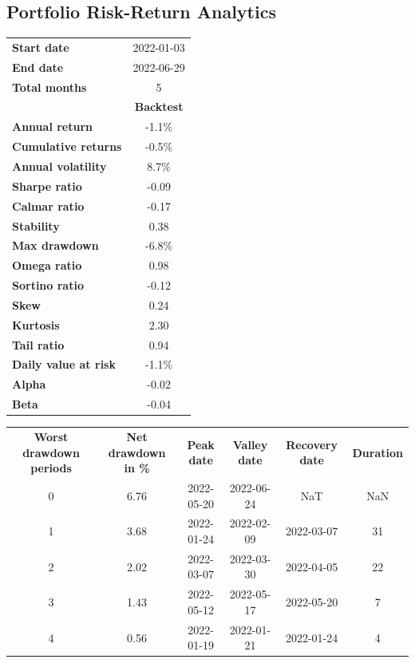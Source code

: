 \documentclass[a4paper, 11pt]{article}
\begin{document}
\subsection{Portfolio Risk-Return Analytics}
\begin{table}[!ht]
{
\begin{tabular}{lc}
\toprule
\textbf{Start date}         &   2022-01-03     \\
\textbf{End date}         &     2022-06-29 \\
\textbf{Total months}        &   5  \\
\textbf{}        &   \textbf{Backtest}  \\
\textbf{Annual return}        &   -1.1\%  \\
\textbf{Cumulative returns}        &   -0.5\%  \\
\textbf{Annual volatility}        &   8.7\%  \\
\textbf{Sharpe ratio}        &   -0.09  \\
\textbf{Calmar ratio}        &   -0.17 \\
\textbf{Stability}        &   0.38  \\
\textbf{Max drawdown}        &   -6.8\%  \\
\textbf{Omega ratio}        &   0.98  \\
\textbf{Sortino ratio}        &   -0.12  \\
\textbf{Skew}        &   0.24  \\
\textbf{Kurtosis	}        &   2.30  \\
\textbf{Tail ratio}        &   0.94  \\
\textbf{Daily value at risk} & 	-1.1\% \\
\textbf{Alpha}        &   -0.02  \\
\textbf{Beta}        &   -0.04  \\
\end{tabular}
}

{

\begin{tabular}{cccccc}
\toprule
\textbf{Worst drawdown periods}       &  \textbf{Net drawdown in \%} & \textbf{Peak date} &   \textbf{Valley date} & \textbf{Recovery date} &  \textbf{Duration} \\
0     &  6.76 & 2022-05-20 &    2022-06-24 & NaT & NaN  \\
1     &  3.68 & 2022-01-24 &   2022-02-09 &    2022-03-07 & 31 \\
2     & 2.02 & 2022-03-07 &   2022-03-30 &  2022-04-05  &  22  \\
3     &  1.43 & 2022-05-12 &    2022-05-17 &  2022-05-20	 &  7 \\
4     &  0.56 & 2022-01-19 &     2022-01-21	  &  2022-01-24   & 4   \\
\bottomrule
\end{tabular}
}
\end{table}
\FloatBarrier
\end{document}
